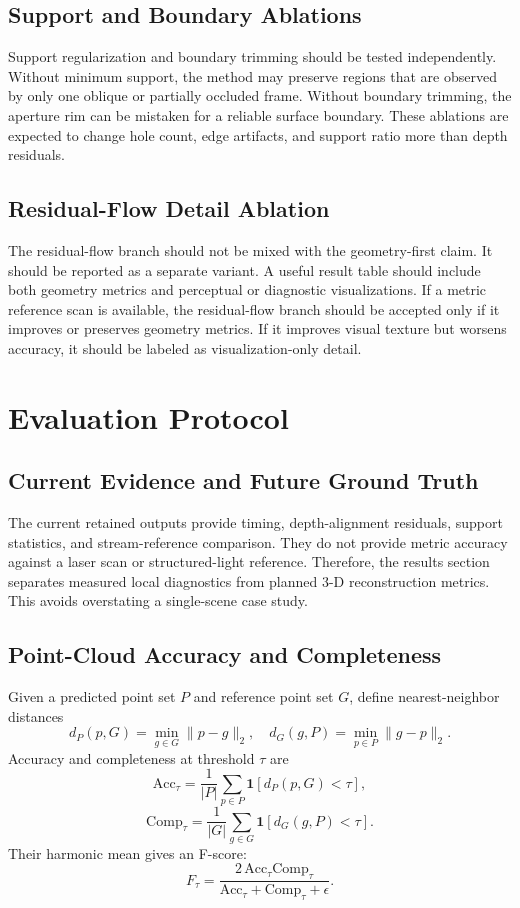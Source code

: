 \documentclass[conference]{IEEEtran}
\begin{document}
\subsection{Support and Boundary Ablations}
Support regularization and boundary trimming should be tested independently. Without minimum support, the method may preserve regions that are observed by only one oblique or partially occluded frame. Without boundary trimming, the aperture rim can be mistaken for a reliable surface boundary. These ablations are expected to change hole count, edge artifacts, and support ratio more than depth residuals.

\subsection{Residual-Flow Detail Ablation}
The residual-flow branch should not be mixed with the geometry-first claim. It should be reported as a separate variant. A useful result table should include both geometry metrics and perceptual or diagnostic visualizations. If a metric reference scan is available, the residual-flow branch should be accepted only if it improves or preserves geometry metrics. If it improves visual texture but worsens accuracy, it should be labeled as visualization-only detail.

\section{Evaluation Protocol}
\subsection{Current Evidence and Future Ground Truth}
The current retained outputs provide timing, depth-alignment residuals, support statistics, and stream-reference comparison. They do not provide metric accuracy against a laser scan or structured-light reference. Therefore, the results section separates measured local diagnostics from planned 3-D reconstruction metrics. This avoids overstating a single-scene case study.

\subsection{Point-Cloud Accuracy and Completeness}
Given a predicted point set $P$ and reference point set $G$, define nearest-neighbor distances
\begin{equation}
d_P(p,G)=\min_{g\in G}\|p-g\|_2,\quad
d_G(g,P)=\min_{p\in P}\|g-p\|_2.
\end{equation}
Accuracy and completeness at threshold $\tau$ are
\begin{equation}
\mathrm{Acc}_{\tau}=\frac{1}{|P|}\sum_{p\in P}\mathbf{1}[d_P(p,G)<\tau],
\end{equation}
\begin{equation}
\mathrm{Comp}_{\tau}=\frac{1}{|G|}\sum_{g\in G}\mathbf{1}[d_G(g,P)<\tau].
\end{equation}
Their harmonic mean gives an F-score:
\begin{equation}
F_{\tau}=\frac{2\,\mathrm{Acc}_{\tau}\mathrm{Comp}_{\tau}}
{\mathrm{Acc}_{\tau}+\mathrm{Comp}_{\tau}+\epsilon}.
\end{equation}
\end{document}
